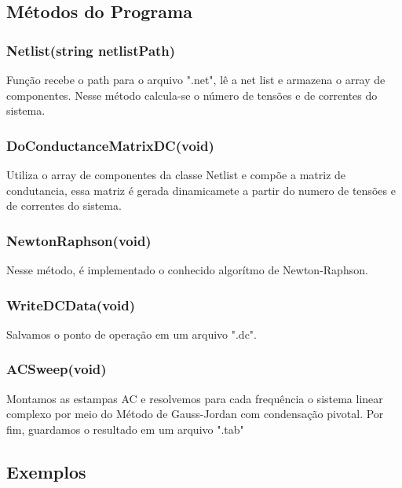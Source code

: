\documentclass[a4paper,12pt]{article} %
\begin{document}
 \subsection{Métodos do Programa}
 \subsubsection{Netlist(string netlistPath)}
 Função recebe o path para o arquivo ".net", lê a net list e armazena o array de componentes. Nesse método calcula-se o número de tensões e de correntes do sistema.
  \subsubsection{DoConductanceMatrixDC(void)}
  Utiliza o array de componentes da classe Netlist e compõe a matriz de condutancia, essa matriz é gerada dinamicamete a partir do numero de tensões e de correntes do sistema.
  \subsubsection{NewtonRaphson(void)}
  Nesse método, é implementado o conhecido algorítmo de Newton-Raphson.
  \subsubsection{WriteDCData(void)}
  Salvamos o ponto de operação em um arquivo ".dc".
  \subsubsection{ACSweep(void)}
  Montamos as estampas AC e resolvemos para cada frequência o sistema linear complexo por meio do Método de Gauss-Jordan com condensação pivotal. Por fim, guardamos o resultado em um arquivo ".tab"
 \subsection{Exemplos}
\end{document}
